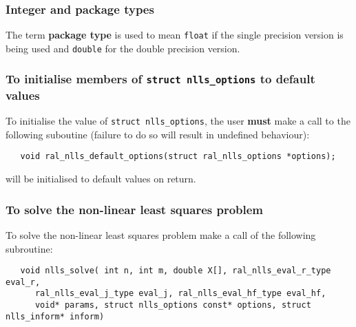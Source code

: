 \documentclass{spec}
\begin{document}
\hslarguments

\subsubsection{Integer and package types}
The term {\bf package type} is used to mean \texttt{float}
if the single precision version is being used and
\texttt{double} for the double precision version.

\subsubsection{To initialise members of \texttt{struct nlls\_options} to default values}

To initialise the value of \texttt{struct nlls\_options}, the user \textbf{must} make a
call to the following suboutine (failure to do so will result in undefined behaviour):
\begin{verbatim}
   void ral_nlls_default_options(struct ral_nlls_options *options);
\end{verbatim}

\begin{description}
    will be initialised to default values on return.
\end{description}

\subsubsection{To solve the non-linear least squares problem}
\label{sec:solve}

To solve the non-linear least squares problem make a call of the following
subroutine:

\begin{verbatim}
   void nlls_solve( int n, int m, double X[], ral_nlls_eval_r_type eval_r,
      ral_nlls_eval_j_type eval_j, ral_nlls_eval_hf_type eval_hf,
      void* params, struct nlls_options const* options, struct nlls_inform* inform)
\end{verbatim}
\end{document}
